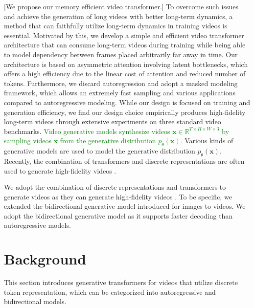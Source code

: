 \documentclass[10pt,twocolumn,letterpaper]{article}
\newcommand{\warn}[1]{\textcolor{green}{#1}}
\begin{document}
[We propose our memory efficient video transformer.]
To overcome such issues and achieve the generation of long videos with better long-term dynamics, a method that can faithfully utilize long-term dynamics in training videos is essential.
Motivated by this, we develop a simple and efficient video transformer architecture that can consume long-term videos during training while being able to model dependency between frames placed arbitrarily far away in time.
Our architecture is based on asymmetric attention involving latent bottlenecks, which offers a high efficiency due to the linear cost of attention and reduced number of tokens.
Furthermore, we discard autoregression and adopt a masked modeling framework, which allows an extremely fast sampling and various applications compared to autoregressive modeling.
While our design is focused on training and generation efficiency, we find our design choice empirically produces high-fidelity long-term videos through extensive experiments on three standard video benchmarks.
\fi \iffalse
\ifdefined\paratitle {\color{blue}
[Discrete representation with transformers can synthesize high-fidelity videos.] \\
} \fi
\warn{Video generative models synthesize videos $\mathbf{x} \in \mathbb{R}^{T \times H \times W \times 3}$ by sampling videos $\mathbf{x}$ from the generative distribution $p_\theta(\mathbf{x})$.} Various kinds of generative models are used to model the generative distribution $p_\theta(\mathbf{x})$.
Recently, the combination of transformers and discrete representations are often used to generate high-fidelity videos \cite{TATS, videoGPT}.

\ifdefined{} \fi
We adopt the combination of discrete representations and transformers to generate videos as they can generate high-fidelity videos \cite{VideoGPT, TATS}. To be specific, we extended the bidirectional generative model \cite{MaskGIT} introduced for images to videos. We adopt the bidirectional generative model as it supports faster decoding than autoregressive models.
\fi

\section{Background}
This section introduces generative transformers for videos that utilize discrete token representation, which can be categorized into autoregressive and bidirectional models.
\end{document}
